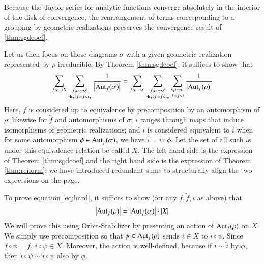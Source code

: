 \documentclass{article}
\newcommand{\Aut}{\text{\textnormal{Aut}}}
\newcommand{\wabs}[1]{\left|#1\right|}
\begin{document}
            Because the Taylor series for analytic functions converge
            absolutely in the interior of the disk of convergence, the
            rearrangement of terms corresponding to a grouping by geometric
            realizations preserves the convergence result of \ref{thm:sgdcoef}.  

            Let us then focus on those diagrams $\sigma$ with a given geometric
            realization represented by $\rho$ irreducible.  By Theorem
            \ref{thm:sgdcoef}, it suffices to show that
            \begin{equation} \label{eq:hard}
                \sum_{f:\rho\to S}
                \sum_{\substack{
                    \tilde f:\sigma\to S \\
                    \exists i_\star: f=\tilde f \circ i_\star
                }}
                \frac{1}{\wabs{\Aut_{\tilde f}(\sigma)}}
                =
                \sum_{f:\rho\to S}
                \sum_{\substack{
                    \tilde f:\sigma\to S \\
                    \exists i_\star: f=\tilde f \circ i_\star
                }}
                \sum_{\substack{
                    i:\rho\to\sigma \\
                    f = \tilde f \circ i
                }}
                \frac{1}{\wabs{\Aut_{f}(\rho)}}
            \end{equation}
            Here, $f$ is considered up to equivalence by precomposition by an
            automorphism of $\rho$; likewise for $\tilde f$ and automorphisms
            of $\sigma$; $i$ ranges through maps that induce isomorphisms of
            geometric realizations; and $i$ is considered equivalent to $\hat
            i$ when for some automorphism $\phi \in \Aut_{\tilde f}(\sigma)$,
            we have $\hat i = i \circ \phi$.  Let the set of all such $i$s
            under this equivalence relation be called $X$.  The left hand side
            is the expression of Theorem \ref{thm:sgdcoef} and the right hand
            side is the expression of Theorem \ref{thm:renorm}; we have
            introduced redundant sums to structurally align the two expressions
            on the page.

            To prove equation \ref{eq:hard}, it suffices to show (for any
            $f, \tilde f, i$ as above) that
            $$
                \wabs{\Aut_f(\rho)}
                =
                \wabs{\Aut_{\tilde f}(\sigma)}
                \cdot
                \wabs{X}
            $$
            We will prove this using Orbit-Stabilizer by presenting an
            action of $\Aut_f(\rho)$ on $X$.  We simply use precomposition so
            that $\psi\in \Aut_f(\rho)$ sends $i\in X$ to $i\circ \psi$.  Since
            $f\circ\psi = f$, $i\circ \psi \in X$.  Moreover, the action is
            well-defined, because if $i\sim \hat i$ by $\phi$, then 
            $i \circ \psi \sim \hat i \circ \psi$ also by $\phi$.
            
\end{document}
